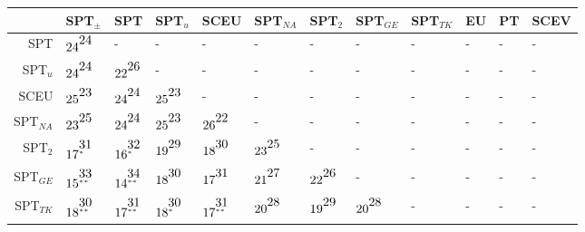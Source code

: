 \begin{table}[!htb]
\centering
\begin{tabular}{rlllllllllll}
  \hline
 & SPT$_{\pm}$ & SPT & SPT$_{u}$ & SCEU & SPT$_{NA}$ & SPT$_{2}$ & SPT$_{GE}$ & SPT$_{TK}$ & EU & PT & SCEV \\ 
  \hline
SPT & $24^{\stackrel{\textstyle24\hfill}{\scriptscriptstyle\hfill}}$ & - & - & - & - & - & - & - & - & - & - \\ 
  SPT$_{u}$ & $24^{\stackrel{\textstyle24\hfill}{\scriptscriptstyle\hfill}}$ & $22^{\stackrel{\textstyle26\hfill}{\scriptscriptstyle\hfill}}$ & - & - & - & - & - & - & - & - & - \\ 
  SCEU & $25^{\stackrel{\textstyle23\hfill}{\scriptscriptstyle\hfill}}$ & $24^{\stackrel{\textstyle24\hfill}{\scriptscriptstyle\hfill}}$ & $25^{\stackrel{\textstyle23\hfill}{\scriptscriptstyle\hfill}}$ & - & - & - & - & - & - & - & - \\ 
  SPT$_{NA}$ & $23^{\stackrel{\textstyle25\hfill}{\scriptscriptstyle\hfill}}$ & $24^{\stackrel{\textstyle24\hfill}{\scriptscriptstyle\hfill}}$ & $25^{\stackrel{\textstyle23\hfill}{\scriptscriptstyle\hfill}}$ & $26^{\stackrel{\textstyle22\hfill}{\scriptscriptstyle\hfill}}$ & - & - & - & - & - & - & - \\ 
  SPT$_{2}$ & $17^{\stackrel{\textstyle31\hfill}{\scriptscriptstyle*\hfill}}$ & $16^{\stackrel{\textstyle32\hfill}{\scriptscriptstyle*\hfill}}$ & $19^{\stackrel{\textstyle29\hfill}{\scriptscriptstyle\hfill}}$ & $18^{\stackrel{\textstyle30\hfill}{\scriptscriptstyle\hfill}}$ & $23^{\stackrel{\textstyle25\hfill}{\scriptscriptstyle\hfill}}$ & - & - & - & - & - & - \\ 
  SPT$_{GE}$ & $15^{\stackrel{\textstyle33\hfill}{\scriptscriptstyle**\hfill}}$ & $14^{\stackrel{\textstyle34\hfill}{\scriptscriptstyle**\hfill}}$ & $18^{\stackrel{\textstyle30\hfill}{\scriptscriptstyle\hfill}}$ & $17^{\stackrel{\textstyle31\hfill}{\scriptscriptstyle\hfill}}$ & $21^{\stackrel{\textstyle27\hfill}{\scriptscriptstyle\hfill}}$ & $22^{\stackrel{\textstyle26\hfill}{\scriptscriptstyle\hfill}}$ & - & - & - & - & - \\ 
  SPT$_{TK}$ & $18^{\stackrel{\textstyle30\hfill}{\scriptscriptstyle**\hfill}}$ & $17^{\stackrel{\textstyle31\hfill}{\scriptscriptstyle**\hfill}}$ & $18^{\stackrel{\textstyle30\hfill}{\scriptscriptstyle*\hfill}}$ & $17^{\stackrel{\textstyle31\hfill}{\scriptscriptstyle**\hfill}}$ & $20^{\stackrel{\textstyle28\hfill}{\scriptscriptstyle\hfill}}$ & $19^{\stackrel{\textstyle29\hfill}{\scriptscriptstyle\hfill}}$ & $20^{\stackrel{\textstyle28\hfill}{\scriptscriptstyle\hfill}}$ & - & - & - & - \\ 

\end{tabular}
\end{table}
